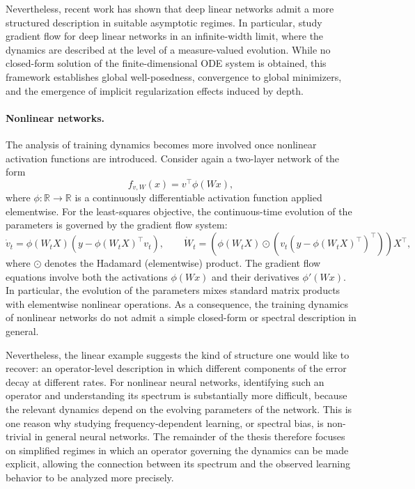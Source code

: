 Nevertheless, recent work has shown that deep linear networks admit a more
structured description in suitable asymptotic regimes. In particular, \citet{chizat2022infinitewidthlimitdeeplinear} study gradient flow for deep
linear networks in an infinite-width limit, where the dynamics are described at
the level of a measure-valued evolution. While no closed-form solution of the
finite-dimensional ODE system is obtained, this framework establishes global
well-posedness, convergence to global minimizers, and the emergence of implicit
regularization effects induced by depth.

\paragraph{Nonlinear networks.}
The analysis of training dynamics becomes more involved once nonlinear
activation functions are introduced. Consider again a two-layer network of the form
\[
	f_{v,W}(x) = v^\top \phi(Wx),
\]
where $\phi:\mathbb{R}\to\mathbb{R}$ is a continuously differentiable activation
function applied elementwise. For the least-squares objective, the continuous-time evolution of the parameters is governed by the gradient flow system:
\begin{equation}
	\dot v_t = \phi(W_tX)(y - \phi(W_tX)^\top v_t),
	\qquad
	\dot W_t = \left( \phi(W_tX) \odot \left( v_t (y - \phi(W_tX)^\top)^\top \right) \right)X^\top,
\end{equation}
where $\odot$ denotes the Hadamard (elementwise) product.
The gradient flow equations involve both the activations $\phi(Wx)$
and their derivatives $\phi'(Wx)$. In particular, the evolution of the
parameters mixes standard matrix products with elementwise nonlinear
operations. As a consequence, the training dynamics of nonlinear networks do not admit a
simple closed-form or spectral description in general.

Nevertheless, the linear example suggests the kind of structure one would like
to recover: an operator-level description in which different components of the
error decay at different rates. For nonlinear neural networks, identifying such
an operator and understanding its spectrum is substantially more difficult,
because the relevant dynamics depend on the evolving parameters of the network.
This is one reason why studying frequency-dependent learning, or spectral bias,
is non-trivial in general neural networks. The remainder of the thesis therefore
focuses on simplified regimes in which an operator governing the dynamics can be
made explicit, allowing the connection between its spectrum and the observed
learning behavior to be analyzed more precisely.

